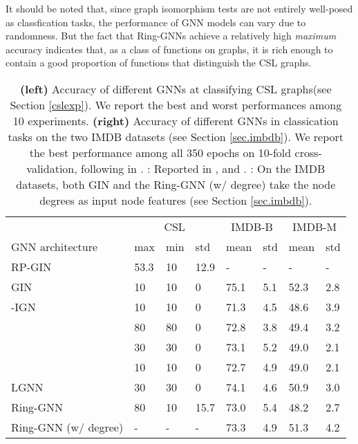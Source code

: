 \documentclass{article}
\begin{document}
It should be noted that, since graph isomorphism tests are not entirely well-posed as classfication tasks, the performance of GNN models can vary due to randomness. But the fact that Ring-GNNs achieve a relatively high \emph{maximum} accuracy indicates that, as a class of functions on graphs, it is rich enough to contain a good proportion of functions that distinguish the CSL graphs. 

\begin{table}[ht]
\centering
\begin{tabular}{l|lll||ll|ll}
\hline
& \multicolumn{3}{|c||}{CSL} & \multicolumn{2}{c|}{IMDB-B} & \multicolumn{2}{c}{IMDB-M} \\
GNN architecture              & max  & min & std  & mean & std & mean & std \\
\hline \hline
RP-GIN               & 53.3 & 10  & 12.9 & -     & -     & -     & -     \\
GIN         & 10   & 10  & 0    & 75.1  & 5.1   & 52.3  & 2.8   \\
-IGN  & 10   & 10  & 0    & 71.3 & 4.5   & 48.6 & 3.9   \\
                        & 80   & 80  & 0    & 72.8  & 3.8   & 49.4  & 3.2   \\
                        & 30   & 30  & 0    & 73.1  & 5.2   & 49.0    & 2.1   \\
                        & 10   & 10  & 0    & 72.7  & 4.9   & 49.0    & 2.1   \\
LGNN \cite{chen2019cdsbm}                         & 30   & 30  & 0    & 74.1  & 4.6   & 50.9  & 3.0     \\
Ring-GNN                          & 80   & 10  & 15.7    & 73.0  & 5.4   & 48.2  & 2.7  \\
Ring-GNN (w/ degree)   &   -    &   -    &   -    &  73.3   & 4.9  & 51.3  & 4.2 \\
\hline
\end{tabular}
\vspace{5pt}
\caption{\textbf{(left)} Accuracy of different GNNs at classifying CSL graphs(see Section \ref{cslexp}). We report the best and worst performances among 10 experiments.
\textbf{(right)} Accuracy of different GNNs in classication tasks on the two IMDB datasets (see Section \ref{sec.imbdb}). We report the best performance among all 350 epochs on 10-fold cross-validation, following in \cite{xu2018powerful}. 
: Reported in \cite{murphy2019relational}, \cite{xu2018powerful} and \cite{maron2018invariant}. 
: On the IMDB datasets, both GIN and the Ring-GNN (w/ degree) take the node degrees as input node features (see Section \ref{sec.imbdb}). 
}
\label{table.synthetic}
\end{table}
\end{document}
